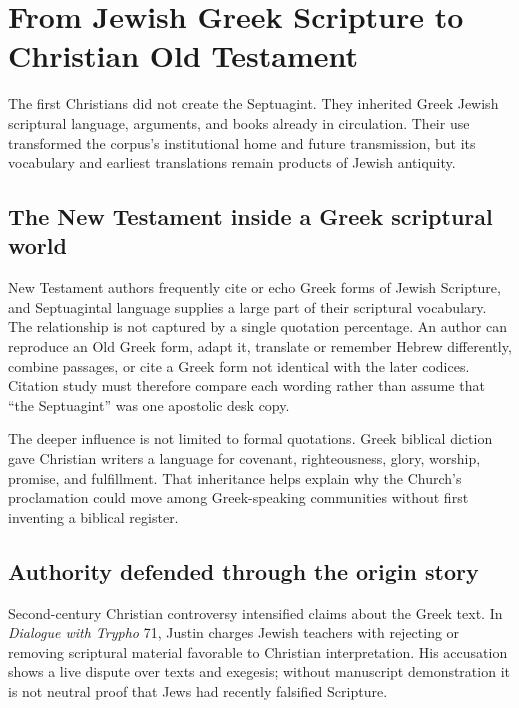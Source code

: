 \section{From Jewish Greek Scripture to Christian Old Testament}

The first Christians did not create the Septuagint. They inherited Greek Jewish scriptural language, arguments, and books already in circulation. Their use transformed the corpus's institutional home and future transmission, but its vocabulary and earliest translations remain products of Jewish antiquity.

\subsection{The New Testament inside a Greek scriptural world}

New Testament authors frequently cite or echo Greek forms of Jewish Scripture, and Septuagintal language supplies a large part of their scriptural vocabulary. The relationship is not captured by a single quotation percentage. An author can reproduce an Old Greek form, adapt it, translate or remember Hebrew differently, combine passages, or cite a Greek form not identical with the later codices. Citation study must therefore compare each wording rather than assume that ``the Septuagint'' was one apostolic desk copy.

The deeper influence is not limited to formal quotations. Greek biblical diction gave Christian writers a language for covenant, righteousness, glory, worship, promise, and fulfillment. That inheritance helps explain why the Church's proclamation could move among Greek-speaking communities without first inventing a biblical register.


\subsection{Authority defended through the origin story}

Second-century Christian controversy intensified claims about the Greek text. In \emph{Dialogue with Trypho} 71, Justin charges Jewish teachers with rejecting or removing scriptural material favorable to Christian interpretation. His accusation shows a live dispute over texts and exegesis; without manuscript demonstration it is not neutral proof that Jews had recently falsified Scripture.

